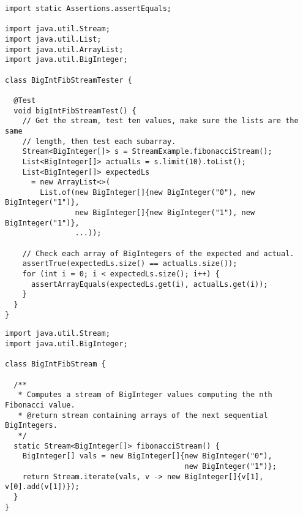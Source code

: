 \begin{cl}[]{}
\begin{lstlisting}[language=MyJava]
import static Assertions.assertEquals;

import java.util.Stream;
import java.util.List;
import java.util.ArrayList;
import java.util.BigInteger;

class BigIntFibStreamTester {

  @Test
  void bigIntFibStreamTest() {
    // Get the stream, test ten values, make sure the lists are the same
    // length, then test each subarray.
    Stream<BigInteger[]> s = StreamExample.fibonacciStream();
    List<BigInteger[]> actualLs = s.limit(10).toList();
    List<BigInteger[]> expectedLs 
      = new ArrayList<>(
        List.of(new BigInteger[]{new BigInteger("0"), new BigInteger("1")},
                new BigInteger[]{new BigInteger("1"), new BigInteger("1")},
                ...));

    // Check each array of BigIntegers of the expected and actual.
    assertTrue(expectedLs.size() == actualLs.size());
    for (int i = 0; i < expectedLs.size(); i++) {
      assertArrayEquals(expectedLs.get(i), actualLs.get(i));
    }
  }
}
\end{lstlisting}
\end{cl}

\begin{cl}[]{}
\begin{lstlisting}[language=MyJava]
import java.util.Stream;
import java.util.BigInteger;

class BigIntFibStream {

  /**
   * Computes a stream of BigInteger values computing the nth Fibonacci value.
   * @return stream containing arrays of the next sequential BigIntegers.
   */
  static Stream<BigInteger[]> fibonacciStream() {
    BigInteger[] vals = new BigInteger[]{new BigInteger("0"), 
                                         new BigInteger("1")};
    return Stream.iterate(vals, v -> new BigInteger[]{v[1], v[0].add(v[1])});
  }
}
\end{lstlisting}
\end{cl}

